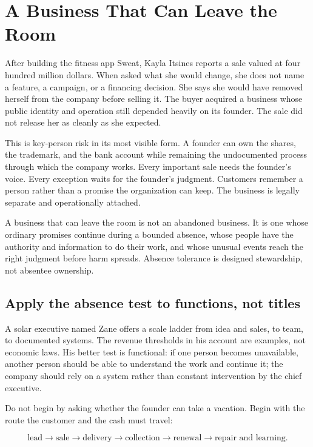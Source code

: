 \chapter{A Business That Can Leave the Room}

After building the fitness app Sweat, Kayla Itsines reports a sale valued at
four hundred million dollars. When asked what she would change, she does not
name a feature, a campaign, or a financing decision. She says she would have
removed herself from the company before selling it. The buyer acquired a
business whose public identity and operation still depended heavily on its
founder. The sale did not release her as cleanly as she expected.

This is key-person risk in its most visible form. A founder can own the shares,
the trademark, and the bank account while remaining the undocumented process
through which the company works. Every important sale needs the founder's
voice. Every exception waits for the founder's judgment. Customers remember a
person rather than a promise the organization can keep. The business is legally
separate and operationally attached.

A business that can leave the room is not an abandoned business. It is one
whose ordinary promises continue during a bounded absence, whose people have
the authority and information to do their work, and whose unusual events reach
the right judgment before harm spreads. Absence tolerance is designed
stewardship, not absentee ownership.

\section{Apply the absence test to functions, not titles}

A solar executive named Zane offers a scale ladder from idea and sales, to team,
to documented systems. The revenue thresholds in his account are examples,
not economic laws. His better test is functional: if one person becomes
unavailable, another person should be able to understand the work and continue
it; the company should rely on a system rather than constant intervention by
the chief executive.

Do not begin by asking whether the founder can take a vacation. Begin with the
route the customer and the cash must travel:

\begin{equation}
\text{lead}\longrightarrow\text{sale}\longrightarrow\text{delivery}
\longrightarrow\text{collection}\longrightarrow\text{renewal}
\longrightarrow\text{repair and learning}.
\end{equation}

